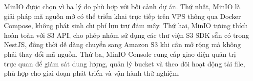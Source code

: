 MinIO \cite{minio} được chọn vì ba lý do phù hợp với bối cảnh dự án. Thứ nhất, MinIO là giải pháp mã nguồn mở có thể triển khai trực tiếp trên VPS thông qua Docker Compose, không phát sinh chi phí lưu trữ đám mây. Thứ hai, MinIO tương thích hoàn toàn với S3 API, cho phép nhóm sử dụng các thư viện S3 SDK sẵn có trong NestJS, đồng thời dễ dàng chuyển sang Amazon S3 khi cần mở rộng mà không phải thay đổi mã nguồn. Thứ ba, MinIO Console cung cấp giao diện quản trị trực quan để giám sát dung lượng, quản lý bucket và theo dõi hoạt động tải file, phù hợp cho giai đoạn phát triển và vận hành thử nghiệm.

